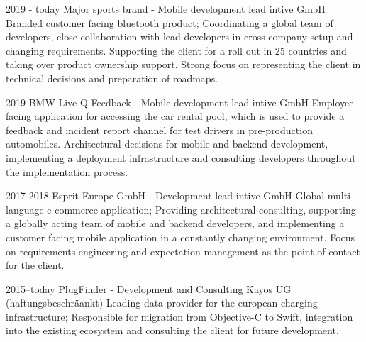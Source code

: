\documentclass[]{friggeri-cv} %
\begin{document}
\begin{entrylist}
	
	\entry
	{2019 - today}
	{Major sports brand - Mobile development lead}
	{intive GmbH}
	{Branded customer facing bluetooth product; Coordinating a global team of developers, close collaboration with lead developers in cross-company setup and changing requirements. Supporting the client for a roll out in 25 countries and taking over product ownership support. Strong focus on representing the client in technical decisions and preparation of roadmaps.}
	
	
	
	\entry
	{2019}
	{BMW Live Q-Feedback - Mobile development lead}
	{intive GmbH}
	{Employee facing application for accessing the car rental pool, which is used to provide a feedback and incident report channel for test drivers in pre-production automobiles. Architectural decisions for mobile and backend development, implementing a deployment infrastructure and consulting developers throughout the implementation process.}
	
	
	\entry
	{2017-2018}
	{Esprit Europe GmbH - Development lead}
	{intive GmbH}
	{Global multi language e-commerce application; Providing architectural consulting, supporting a globally acting team of mobile and backend developers, and implementing a customer facing mobile application in a constantly changing environment. Focus on requirements engineering and expectation management as the point of contact for the client.}
	
	
	\entry
	{2015--today}
	{PlugFinder - Development and Consulting}
	{Kayos UG (haftungsbeschr\"{a}ankt)}
	{Leading data provider for the european charging infrastructure; Responsible for migration from Objective-C to Swift, integration into the existing ecosystem and consulting the client for future development.}
	
	
	
	
	
	
\end{entrylist}
\end{document}

